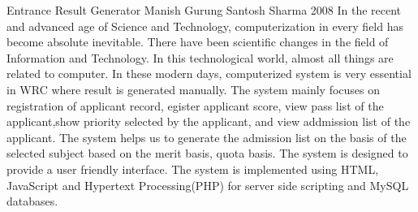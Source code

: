  \begin{conf-abstract}[]
{Entrance Result Generator}
{
Manish Gurung
Santosh Sharma
}
{2008}
	In the recent and advanced age of Science and Technology, computerization in every field has become 
absolute inevitable. There have been scientific changes in the field of Information and Technology. In this 
technological world, almost all things are related to computer. In these modern days, computerized system is 
very essential in WRC where result is generated manually. The system mainly focuses on registration of 
applicant record, egister applicant score, view pass list of the applicant,show priority selected by the 
applicant, and view addmission list of the applicant. The system helps us to generate the admission list on the
basis of the selected subject based on the merit basis, quota basis. The system is designed to provide a user 
friendly interface. The system is implemented using HTML, JavaScript and Hypertext Processing(PHP) for server 
side scripting and MySQL databases.
  \end{conf-abstract}